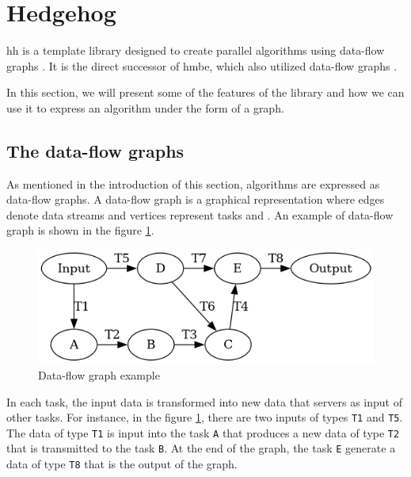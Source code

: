 
\section{Hedgehog}
\label{sec:hh}

\gls{hh} is a template library designed to create parallel algorithms using
data-flow graphs \cite{bardakoff2021analysis}. It is the direct successor of
\gls{hmbe}, which also utilized data-flow graphs \cite{blattner2017model}.

In this section, we will present some of the features of the library and how
we can use it to express an algorithm under the form of a graph.

\subsection{The data-flow graphs}

As mentioned in the introduction of this section, algorithms are expressed as
data-flow graphs. A data-flow graph is a graphical representation where edges
denote data streams and vertices represent tasks \cite{kavi1986formal} and
\cite{bardakoff2021analysis}. An example of data-flow graph is shown in the
figure \ref{fig:data-flow-graph-example}.

\begin{figure}[h!]
  \begin{center}
    \includegraphics[scale=0.5]{./img/data-flow-graph-example.png}
    \caption{Data-flow graph example}
    \label{fig:data-flow-graph-example}
  \end{center}
\end{figure}

In each task, the input data is transformed into new data that servers as input
of other tasks. For instance, in the figure \ref{fig:data-flow-graph-example},
there are two inputs of types \texttt{T1} and \texttt{T5}. The data of type
\texttt{T1} is input into the task \texttt{A} that produces a new data of type
\texttt{T2} that is transmitted to the task \texttt{B}. At the end of the graph,
the task \texttt{E} generate a data of type \texttt{T8} that is the output of
the graph.

